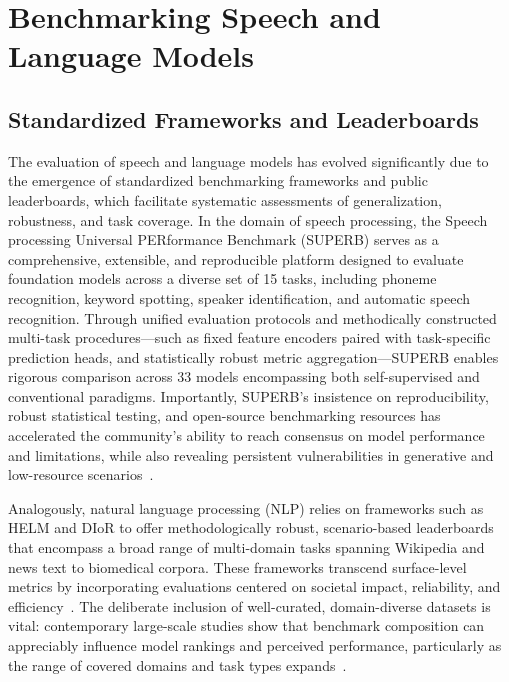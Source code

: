 \documentclass[sigconf]{acmart}
\begin{document}
\section{Benchmarking Speech and Language Models}

\subsection{Standardized Frameworks and Leaderboards}

The evaluation of speech and language models has evolved significantly due to the emergence of standardized benchmarking frameworks and public leaderboards, which facilitate systematic assessments of generalization, robustness, and task coverage. In the domain of speech processing, the Speech processing Universal PERformance Benchmark (SUPERB) serves as a comprehensive, extensible, and reproducible platform designed to evaluate foundation models across a diverse set of 15 tasks, including phoneme recognition, keyword spotting, speaker identification, and automatic speech recognition. Through unified evaluation protocols and methodically constructed multi-task procedures—such as fixed feature encoders paired with task-specific prediction heads, and statistically robust metric aggregation—SUPERB enables rigorous comparison across 33 models encompassing both self-supervised and conventional paradigms. Importantly, SUPERB’s insistence on reproducibility, robust statistical testing, and open-source benchmarking resources has accelerated the community’s ability to reach consensus on model performance and limitations, while also revealing persistent vulnerabilities in generative and low-resource scenarios~\cite{ref101,ref104}.

Analogously, natural language processing (NLP) relies on frameworks such as HELM and DIoR to offer methodologically robust, scenario-based leaderboards that encompass a broad range of multi-domain tasks spanning Wikipedia and news text to biomedical corpora. These frameworks transcend surface-level metrics by incorporating evaluations centered on societal impact, reliability, and efficiency~\cite{ref104,ref106}. The deliberate inclusion of well-curated, domain-diverse datasets is vital: contemporary large-scale studies show that benchmark composition can appreciably influence model rankings and perceived performance, particularly as the range of covered domains and task types expands~\cite{ref106}.
\end{document}
